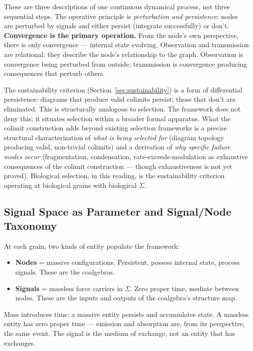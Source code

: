 \documentclass[12pt,a4paper]{article}
\begin{document}
These are three descriptions of one continuous dynamical process, not three sequential steps. The operative principle is \emph{perturbation and persistence}: nodes are perturbed by signals and either persist (integrate successfully) or don't. \textbf{Convergence is the primary operation.} From the node's own perspective, there is only convergence --- internal state evolving. Observation and transmission are relational: they describe the node's relationship to the graph. Observation is convergence being perturbed from outside; transmission is convergence producing consequences that perturb others.

The sustainability criterion (Section~\ref{sec:sustainability}) is a form of differential persistence: diagrams that produce valid colimits persist; those that don't are eliminated. This is structurally analogous to selection. The framework does not deny this; it situates selection within a broader formal apparatus. What the colimit construction adds beyond existing selection frameworks is a precise structural characterization of \emph{what is being selected for} (diagram topology producing valid, non-trivial colimits) and a derivation of \emph{why specific failure modes occur} (fragmentation, condensation, rate-exceeds-modulation as exhaustive consequences of the colimit construction --- though exhaustiveness is not yet proved). Biological selection, in this reading, is the sustainability criterion operating at biological grains with biological $\Sigma$.

\subsection{Signal Space as Parameter and Signal/Node Taxonomy}
\label{sec:signal-space}

At each grain, two kinds of entity populate the framework:

\begin{itemize}
  \item \textbf{Nodes} = massive configurations. Persistent, possess internal state, process signals. These are the coalgebras.
  \item \textbf{Signals} = massless force carriers in $\Sigma$. Zero proper time, mediate between nodes. These are the inputs and outputs of the coalgebra's structure map.
\end{itemize}

Mass introduces time: a massive entity persists and accumulates state. A massless entity has zero proper time --- emission and absorption are, from its perspective, the same event. The signal is the medium of exchange, not an entity that has exchanges.
\end{document}
